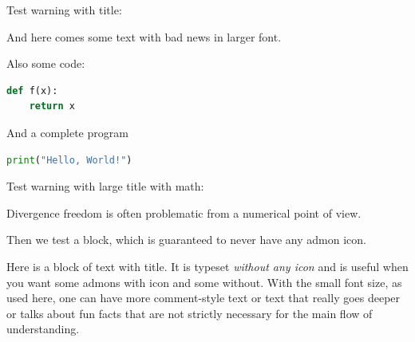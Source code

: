 \documentclass[%
oneside,                 %
final,                   %
10pt]{article}
\newenvironment{warningshaded}
{\def\FrameCommand{\fboxsep=3mm\colorbox{colors1_warning_background}}
 \MakeFramed {\advance\hsize-\width \FrameRestore}}{\endMakeFramed}
\newenvironment{warning_colors1admon}[1][Warning]{
\begin{warningshaded}
\noindent
\texttt{[image: latex\_figs/warning]}\ \ \   \textbf{#1}\\ \par
\vspace{-3mm}\nobreak\noindent\ignorespaces
}
{
\end{warningshaded}
}
\newenvironment{blockshaded}
{\def\FrameCommand{\fboxsep=3mm\colorbox{colors1_block_background}}
 \MakeFramed {\advance\hsize-\width \FrameRestore}}{\endMakeFramed}
\newenvironment{block_colors1admon}[1][Block]{
\begin{blockshaded}
\noindent
  \textbf{#1}\\ \par
\vspace{-3mm}\nobreak\noindent\ignorespaces
}
{
\end{blockshaded}
}
\begin{document}
Test warning with title:


\begin{warning_colors1admon}
{\large And here comes some text with bad news in larger font.

Also some code:




\begin{lstlisting}[language=python,style=simple,xleftmargin=2mm]
def f(x):
    return x

\end{lstlisting}

And a complete program



\begin{lstlisting}[language=python,style=simple,xleftmargin=2mm]
print("Hello, World!")

\end{lstlisting}
\par}
\end{warning_colors1admon} %



Test warning with large title with math:


\begin{warning_colors1admon}[{\large Watch out for $\nabla\cdot\bm{u}=0$ equations}]
{\large Divergence freedom is often problematic from a numerical point
of view.
\par}
\end{warning_colors1admon} %



Then we test a block, which is guaranteed to never have any admon icon.


\begin{block_colors1admon}
\vspace{-3.5mm}\par\noindent
{\footnotesize Here is a block of text with title. It is typeset
\emph{without any icon} and is useful when you want some admons with icon
and some without. With the small font size, as used here, one can have
more comment-style text or text that really goes deeper or talks
about fun facts that are not strictly necessary for the main flow
of understanding.
\par}
\end{block_colors1admon} %
\end{document}

